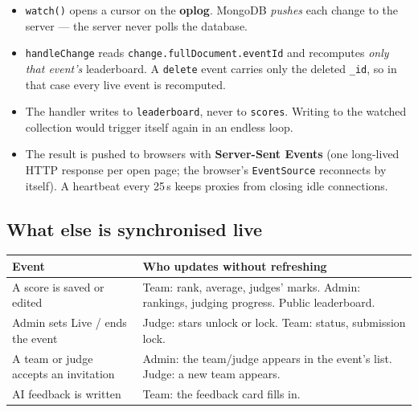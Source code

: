 \documentclass[11pt,a4paper]{article}
\newcommand{\coll}[1]{\texttt{#1}}
\begin{document}
\begin{itemize}[leftmargin=1.4em]
  \item \texttt{watch()} opens a cursor on the \textbf{oplog}. MongoDB \emph{pushes} each change to the server ---
        the server never polls the database.
  \item \texttt{handleChange} reads \texttt{change.fullDocument.eventId} and recomputes \emph{only that event's}
        leaderboard. A \texttt{delete} event carries only the deleted \texttt{\_id}, so in that case every live event
        is recomputed.
  \item The handler writes to \coll{leaderboard}, never to \coll{scores}. Writing to the watched collection would
        trigger itself again in an endless loop.
  \item The result is pushed to browsers with \textbf{Server-Sent Events} (one long-lived HTTP response per open page;
        the browser's \texttt{EventSource} reconnects by itself). A heartbeat every 25\,s keeps proxies from closing
        idle connections.
\end{itemize}

\subsection{What else is synchronised live}
\begin{tabularx}{\linewidth}{@{}p{4.4cm}X@{}}
\toprule
\textbf{Event} & \textbf{Who updates without refreshing}\\
\midrule
A score is saved or edited & Team: rank, average, judges' marks. Admin: rankings, judging progress. Public leaderboard. \\
Admin sets Live / ends the event & Judge: stars unlock or lock. Team: status, submission lock. \\
A team or judge accepts an invitation & Admin: the team/judge appears in the event's list. Judge: a new team appears. \\
AI feedback is written & Team: the feedback card fills in. \\
\bottomrule
\end{tabularx}
\end{document}
